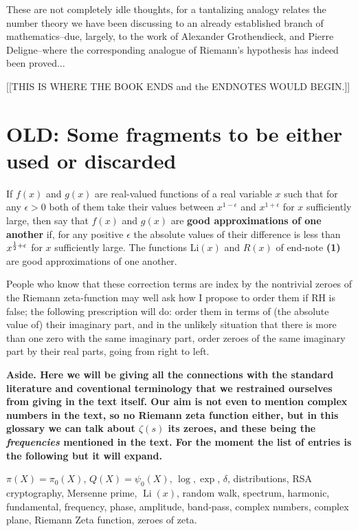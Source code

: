 \documentclass[11pt]{article}
\DeclareMathOperator{\Li}{Li}
\theoremstyle{plain}
\theoremstyle{definition}
\numberwithin{equation}{section}
\numberwithin{figure}{section}
\numberwithin{table}{section}
\begin{document}
\bigskip


These are not completely idle thoughts, for a tantalizing analogy
relates the number theory we have been discussing to an already
established branch of mathematics--due, largely, to the work of
Alexander Grothendieck, and Pierre Deligne--where the corresponding
analogue of Riemann's hypothesis has indeed been proved$\dots$


[[THIS IS WHERE THE BOOK ENDS and the ENDNOTES WOULD BEGIN.]]


\section{OLD: Some fragments to be either used or discarded}

 If $f(x)$ and $g(x)$ are real-valued functions of a real variable $x$ such that
for any
$\epsilon >0$ both of them take their values between $ x^{1-\epsilon}$  and $ x^{1+\epsilon}$ for 
$x$
sufficiently large, then say that $f(x)$ and $g(x)$ are {\bf good approximations of one another} if,
for any positive $\epsilon$ the absolute values of their difference is less than $ x^{{1\over
2}+\epsilon}$ for 
$x$
sufficiently large. The functions Li$(x)$ and $R(x)$ of end-note {\bf (1)} are good approximations of
one another.

\bigskip


 People who know that these correction terms are
index by the nontrivial zeroes of the Riemann zeta-function may well
ask how I propose to order them if RH is false; the following
prescription will do: order them in terms of (the absolute value of)
their imaginary part, and in the unlikely situation that there is more
than one zero with the same imaginary part, order zeroes of the same
imaginary part by their real parts, going from right to left.

\bigskip

{\bf Aside.  Here we will be giving all the connections with the
  standard literature and coventional terminology that we restrained
  ourselves from giving in the text itself. Our aim is not even to
  mention complex numbers in the text, so no Riemann zeta function
  either, but in this glossary we can talk about $\zeta(s)$ its
  zeroes, and these being the {\em frequencies} mentioned in the text.
  For the moment the list of entries is the following but it will
  expand.

  $\pi(X)= \pi_0(X)$, $Q(X)= \psi_0(X)$, $\log, \exp$, $\delta$,
  distributions, RSA cryptography, Mersenne prime, $\Li(x)$, random
  walk, spectrum, harmonic, fundamental, frequency, phase, amplitude,
  band-pass, complex numbers, complex plane, Riemann Zeta function,
  zeroes of zeta.
}
\end{document}
